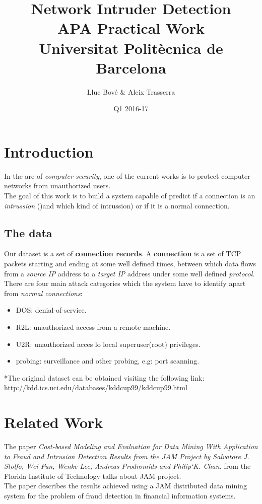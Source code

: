 \documentclass[a4paper]{article} %
\title{Network Intruder Detection \\
\large APA Practical Work \\
Universitat Politècnica de Barcelona} %
\author{Lluc Bové \& Aleix Trasserra} %
\date{Q1 2016-17}
\begin{document}
\maketitle %



\section{Introduction}
In the are of \textit{computer security}, one of the current works is to protect computer networks from unauthorized users. \\
The goal of this work is to build a system capable of predict if a connection is an \textit{intrussion} ()and which kind of intrussion) or if it is a normal connection.  
\subsection{The data}
Our dataset is a set of \textbf{connection records}.
A \textbf{connection} is a set of TCP packets starting and ending at some well defined times, between which data flows from a \textit{source IP} address to a \textit{target IP} address under some well defined \textit{protocol}.
There are four main attack categories which the system have to identify apart from \textit{normal connections}:
\begin{itemize}
	\item DOS: denial-of-service.
	\item R2L: unauthorized access from a remote machine.
	\item U2R: unauthorized acces lo local superuser(root) privileges.
	\item probing: surveillance and other probing, e.g: port scanning.
\end{itemize}

*The original dataset can be obtained visiting the following link: http://kdd.ics.uci.edu/databases/kddcup99/kddcup99.html

\section{Related Work}
The paper \textit{Cost-based Modeling and Evaluation for Data Mining With Application to Fraud and Intrusion Detection Results from the JAM Project by Salvatore J. Stolfo, Wei Fun, Wenke Lee, Andreas Prodromids and Philip`K. Chan.} from the Florida Institute of Technology talks about JAM project. \\
The paper describes the results achieved using a JAM distributed data mining system for the problem of fraud detection in financial information systems. \\
\end{document}
